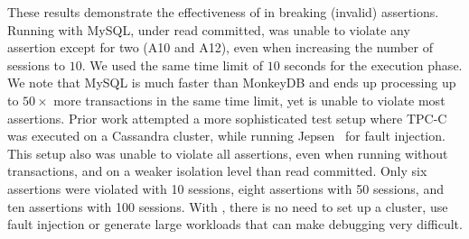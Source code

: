 


These results demonstrate the effectiveness of \tool{} in breaking (invalid) 
assertions. Running with MySQL, under read committed, was unable to violate any assertion except for
two (A10 and A12), even when increasing the number of sessions to $10$. We used
the same time limit of $10$ seconds for the execution phase. We note that MySQL
is much faster than MonkeyDB and ends up processing up to $50\times$ more
transactions in the same time limit, yet is unable to violate most assertions. 
Prior work \cite{DBLP:journals/pacmpl/RahmaniNDJ19} attempted a more sophisticated test
setup where TPC-C was executed on a Cassandra cluster, while running 
Jepsen~\cite{jepsen} for fault injection. This setup also was unable to violate 
all assertions, even when running without transactions, and on a weaker isolation level than read committed. 
Only six assertions were violated with 10 sessions, 
eight assertions with 50 sessions, and ten assertions with 100 sessions.
With \tool{}, there is no need to set up a cluster, use fault injection or
generate large workloads that can make debugging very difficult. 


